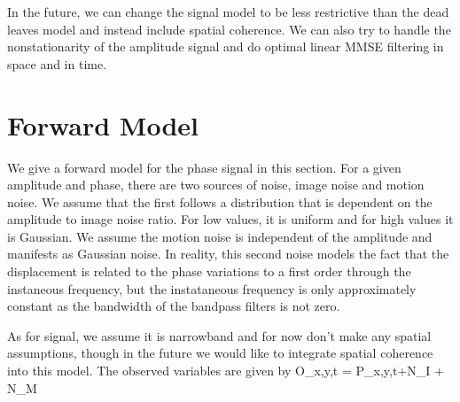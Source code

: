 \documentclass[letterpaper, 10pt]{article}
\numberwithin{equation}{section}
\begin{document}
In the future, we can change the signal model to be less restrictive than the dead leaves model and instead include spatial coherence. We can also try to handle the nonstationarity of the amplitude signal and do optimal linear MMSE filtering in space and in time. 









\section{Forward Model}
We give a forward model for the phase signal in this section. For a given amplitude and phase, there are two sources of noise, image noise and motion noise. We assume that the first follows a distribution that is dependent on the amplitude to image noise ratio. For low values, it is uniform and for high values it is Gaussian. We assume the motion noise is independent of the amplitude and manifests as Gaussian noise. In reality, this second noise models the fact that the displacement is related to the phase variations to a first order through the instaneous frequency, but the instataneous frequency is only approximately constant as the bandwidth of the bandpass filters is not zero. 

As for signal, we assume it is narrowband and for now don't make any spatial assumptions, though in the future we would like to integrate spatial coherence into this model. The observed variables are given by 
\beq O_{x,y,t} = P_{x,y,t}+N_I + N_M \eeq
\end{document}
